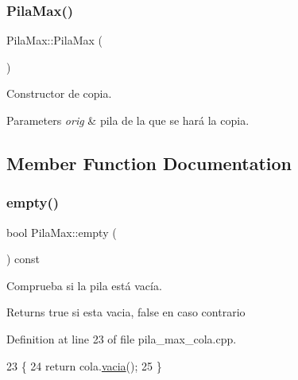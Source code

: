 \subsubsection{\texorpdfstring{Pila\+Max()}{PilaMax()}\hspace{0.1cm}{\footnotesize\ttfamily [2/2]}}
{\footnotesize\ttfamily Pila\+Max\+::\+Pila\+Max (\begin{DoxyParamCaption}\item[{const \hyperlink{classPilaMax}{Pila\+Max} \&}]{ }\end{DoxyParamCaption})}



Constructor de copia. 


\begin{DoxyParams}{Parameters}
{\em orig} & pila de la que se hará la copia. \\
\hline
\end{DoxyParams}


\subsection{Member Function Documentation}
\mbox{\label{classPilaMax_ab31ac009a1c761470cf3cac634396694}} 
\subsubsection{\texorpdfstring{empty()}{empty()}\hspace{0.1cm}{\footnotesize\ttfamily [1/2]}}
{\footnotesize\ttfamily bool Pila\+Max\+::empty (\begin{DoxyParamCaption}{ }\end{DoxyParamCaption}) const}



Comprueba si la pila está vacía. 

\begin{DoxyReturn}{Returns}
true si esta vacia, false en caso contrario 
\end{DoxyReturn}


Definition at line 23 of file pila\+\_\+max\+\_\+cola.\+cpp.


\begin{DoxyCode}
23                          \{
24   \textcolor{keywordflow}{return} cola.\hyperlink{classCola_a2c746a66289cd4f90d4e43f712b72fb6}{vacia}();
25 \}
\end{DoxyCode}
\mbox{\label{classPilaMax_ab31ac009a1c761470cf3cac634396694}} 
